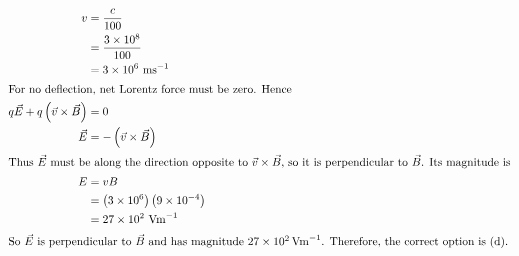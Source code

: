 \begin{solution}
\begin{align*}
v &= \frac{c}{100} \\
  &= \frac{3 \times 10^8}{100} \\
  &= 3 \times 10^6 \ \mathrm{m s}^{-1} \\
\intertext{For no deflection, net Lorentz force must be zero. Hence}
q\vec{E} + q\left( \vec{v} \times \vec{B} \right) &= 0 \\
\vec{E} &= -\left( \vec{v} \times \vec{B} \right) \\
\intertext{Thus $\vec{E}$ must be along the direction opposite to $\vec{v} \times \vec{B}$, so it is perpendicular to $\vec{B}$. Its magnitude is}
E &= v B \\
  &= \left( 3 \times 10^6 \right)\left( 9 \times 10^{-4} \right) \\
  &= 27 \times 10^2 \ \mathrm{V m}^{-1} \\
\intertext{So $\vec{E}$ is perpendicular to $\vec{B}$ and has magnitude $27 \times 10^2\,\mathrm{V m}^{-1}$. Therefore, the correct option is (d).}
\end{align*}
\end{solution}
